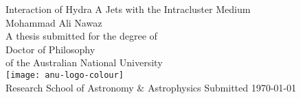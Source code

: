 \documentclass[a4paper,12pt,openright]{report}
\makeatletter
\newcommand{\thesistitle}{Interaction of Hydra A Jets with the Intracluster Medium}
\newcommand{\fullname}{Mohammad Ali Nawaz}
\newcommand{\thesisdate}{\today}
\newcommand{\resubmissiondate}{\today}
\def\cleardoublepage{\clearpage\if@twoside \ifodd\c@page\else
	\hbox{}
	\vspace*{\fill}
	\thispagestyle{empty}
	\newpage
	\if@twocolumn\hbox{}\newpage\fi\fi\fi}
\makeatother
\begin{document}
\setlength{\epigraphwidth}{10cm}
\setlength{\afterepigraphskip}{1.5cm}
\renewcommand{\epigraphsize}{\small}
\renewcommand{\epigraphrule}{0pt}
\renewcommand{\epigraphflush}{center}
\renewcommand{\textflush}{flushleft}
\pagestyle{empty}

%
%
%
%
\begin{titlepage}\selectfont
  \begin{center}
  \phantom{}
  \vspace{0cm}
    \huge{\thesistitle}
    \\[2.5cm]
    \huge{\fullname}
    \\[2.5cm]
    \Large{A thesis submitted for the degree of}\\[0.5cm]
      \Large{Doctor of Philosophy}\\[0.5cm]
      \Large{of the Australian National University}
    \\[2.5cm]
     \texttt{[image: anu-logo-colour]}
     \\[10mm]
        \LARGE{Research School of Astronomy \& Astrophysics}
        \vfill
        \Large{Submitted \thesisdate}\\[1mm]
  \end{center}
\end{titlepage}

\setlength{\parindent}{0pt}
\setlength{\parskip}{1ex plus 0.5ex minus 0.2ex}
\cleardoublepage

\end{document}
